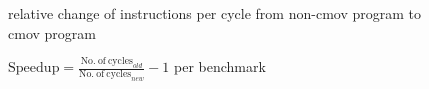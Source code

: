 \documentclass[12pt,twoside,notitlepage]{report}
\begin{document}
\begin{figure}[htp]
\caption{relative change of instructions per cycle from non-cmov program to cmov program}
\end{figure}

\begin{figure}[htp]
\caption{$\mathrm{Speedup} =\frac{\mathrm{No. ~ of ~cycles}_{old}}{\mathrm{No. ~ of ~cycles}_{new}} - 1$ per benchmark}
\end{figure}
\end{document}
